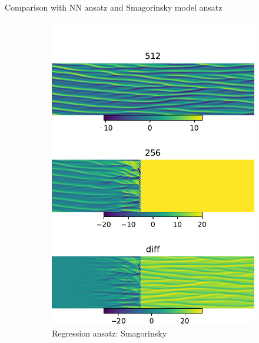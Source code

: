 \documentclass[aspectratio=169]{beamer}
\begin{document}
\begin{frame}{Comparison with NN ansatz and Smagorinsky model ansatz}
\begin{figure}[ht]
\begin{subfigure}[b]{0.32\textwidth}
			\includegraphics[width=\textwidth]{fig/ks_nu0.1_N1512N2256_correct_cmp_lr2e-4.pdf} 
			\caption{Regression ansatz: Smagorinsky} 
		\end{subfigure}
		\begin{subfigure}[b]{0.32\textwidth}
			\centering 

\end{subfigure}
\end{figure}
\end{frame}
\end{document}
